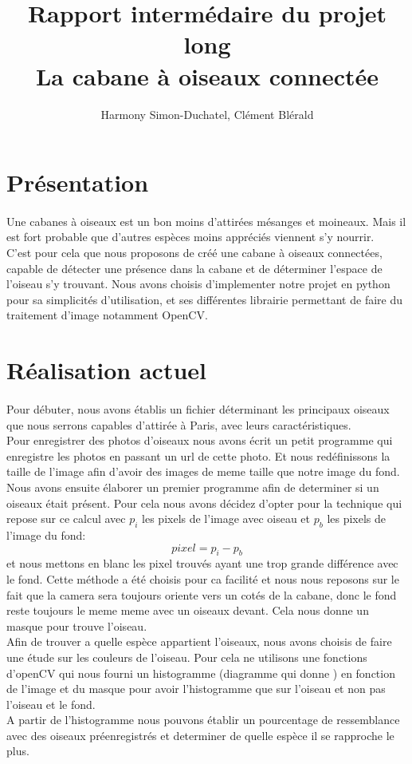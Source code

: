 \documentclass{article}
\title{Rapport intermédaire du projet long \\ La cabane à oiseaux connectée }
\author{Harmony Simon-Duchatel, Clément Blérald}
\begin{document}
\maketitle


\section{Présentation}
\paragraph {}
Une cabanes à oiseaux est un bon moins d'attirées mésanges et moineaux. Mais il est fort probable que d'autres espèces moins appréciés viennent s'y nourrir. \\
C'est pour cela que nous proposons de créé une cabane à oiseaux connectées, capable de détecter une présence dans la cabane et de déterminer l'espace de l'oiseau s'y trouvant. 
Nous avons choisis d'implementer notre projet en python pour sa simplicités d'utilisation, et ses différentes librairie permettant de faire du traitement d'image notamment OpenCV.
\section{Réalisation actuel} 
\paragraph {}
Pour débuter, nous avons établis un fichier déterminant les principaux oiseaux que nous serrons capables d'attirée à Paris, avec leurs caractéristiques. \\
Pour enregistrer des photos d'oiseaux nous avons écrit un petit programme qui enregistre les photos en passant un url de cette photo. Et nous redéfinissons la taille de l'image
afin d'avoir des images de meme taille que notre image du fond.\\
Nous avons ensuite élaborer un premier programme afin de determiner si un oiseaux était présent.
Pour cela nous avons décidez d'opter pour la technique qui repose sur ce calcul  avec $p_{i}$ les pixels de l'image avec oiseau et $p_{b}$ les pixels de l'image du fond: 
$$
pixel = p_{i} - p_{b}
$$
et nous mettons en blanc les pixel trouvés ayant une trop grande différence avec le fond. Cette méthode a été choisis pour ca facilité et nous nous reposons sur le fait que la camera sera toujours oriente vers un cotés de la cabane, donc le fond reste toujours le meme meme avec un oiseaux devant.  Cela nous donne un masque pour trouve l'oiseau.\\
Afin de trouver a quelle espèce appartient l'oiseaux, nous avons choisis de faire une étude sur les couleurs de l'oiseau. Pour cela ne utilisons une fonctions d'openCV qui  nous
fourni un histogramme (diagramme qui donne ) en fonction de  l'image et du masque pour avoir l'histogramme que sur l'oiseau et non pas l'oiseau et le fond.\\
A partir de l'histogramme nous pouvons établir un pourcentage de ressemblance avec des oiseaux préenregistrés et determiner de quelle espèce il se rapproche le plus.\\
\end{document}
